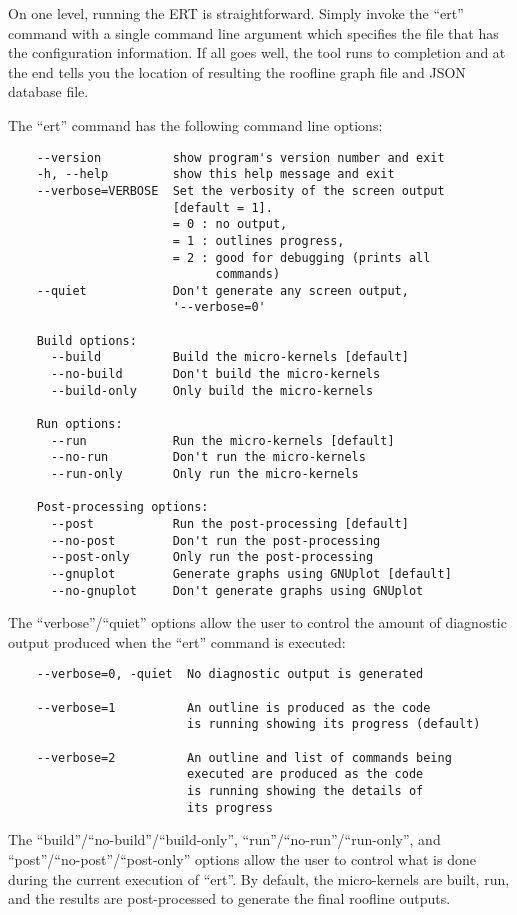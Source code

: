 On one level, running the ERT is straightforward.  Simply invoke the ``ert''
command with a single command line argument which specifies the file that has
the configuration information.  If all goes well, the tool runs to completion
and at the end tells you the location of resulting the roofline graph file 
and JSON database file.

The ``ert'' command has the following command line options:
\begin{verbatim}
    --version          show program's version number and exit
    -h, --help         show this help message and exit
    --verbose=VERBOSE  Set the verbosity of the screen output
                       [default = 1].
                       = 0 : no output,
                       = 1 : outlines progress,
                       = 2 : good for debugging (prints all
                             commands)
    --quiet            Don't generate any screen output,
                       '--verbose=0'

    Build options:
      --build          Build the micro-kernels [default]
      --no-build       Don't build the micro-kernels
      --build-only     Only build the micro-kernels

    Run options:
      --run            Run the micro-kernels [default]
      --no-run         Don't run the micro-kernels
      --run-only       Only run the micro-kernels

    Post-processing options:
      --post           Run the post-processing [default]
      --no-post        Don't run the post-processing
      --post-only      Only run the post-processing
      --gnuplot        Generate graphs using GNUplot [default]
      --no-gnuplot     Don't generate graphs using GNUplot
\end{verbatim}
The ``verbose''/``quiet'' options allow the user to control the amount of
diagnostic output produced when the ``ert'' command is executed:
\begin{verbatim}
    --verbose=0, -quiet  No diagnostic output is generated

    --verbose=1          An outline is produced as the code
                         is running showing its progress (default)

    --verbose=2          An outline and list of commands being
                         executed are produced as the code
                         is running showing the details of
                         its progress
\end{verbatim}
The ``build''/``no-build''/``build-only'', ``run''/``no-run''/``run-only'', and
``post''/``no-post''/``post-only'' options allow the user to
control what is done during the current execution of ``ert''.  By default, the
micro-kernels are built, run, and the results are post-processed to generate
the final roofline outputs.

